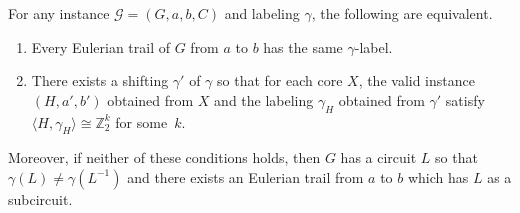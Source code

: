 \documentclass[a4paper, 12pt]{article}
\begin{document}
\begin{theorem}
\label{thm:fullTechnical}
For any instance $\mathcal{G}=(G, a,b,C)$ and labeling $\gamma$, the following are equivalent.\begin{enumerate}
\item\label{itm:cond1} Every Eulerian trail of $G$ from $a$ to $b$ has the same $\gamma$-label.

\item\label{itm:cond2} There exists a shifting $\gamma'$ of $\gamma$ so that for each core $X$, the valid instance $(H, a', b')$ obtained from $X$ and the labeling $\gamma_H$ obtained from $\gamma'$ satisfy $\langle H, \gamma_H\rangle \cong \mathbb{Z}_2^k$ for some~$k$.
\end{enumerate}
Moreover, if neither of these conditions holds, then $G$ has a circuit $L$ so that $\gamma(L) \neq \gamma(L^{-1})$ and there exists an Eulerian trail from $a$ to $b$ which has $L$ as a subcircuit.
\end{theorem}
\end{document}
